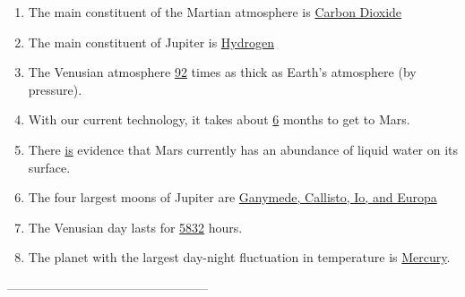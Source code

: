 \documentclass[12pt]{article}
\begin{document}
\begin{enumerate}
    \item The main constituent of the Martian atmosphere is \underline{Carbon Dioxide}
    \item The main constituent of Jupiter is \underline{Hydrogen}
    \item The Venusian atmosphere \underline{92} times as thick as Earth’s atmosphere (by pressure).
    \item With our current technology, it takes about \underline{6} months to get to Mars.
    \item There \underline{is} evidence that Mars currently has an abundance of liquid water on its surface.
    \item The four largest moons of Jupiter are \underline{Ganymede, Callisto, Io, and Europa}
    \item The Venusian day lasts for \underline{5832} hours.
    \item The planet with the largest day-night fluctuation in temperature is \underline{Mercury}.
\end{enumerate}

————————————————
\end{document}
